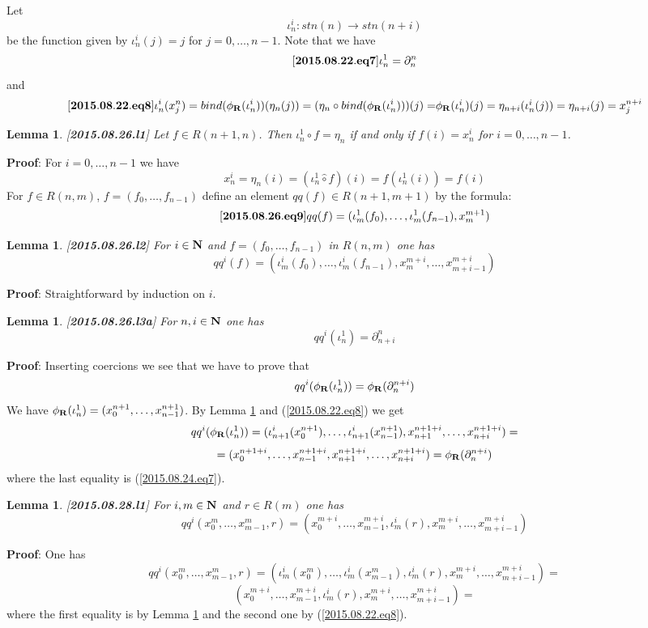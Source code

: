 \documentclass[11pt]{article}
\newenvironment{eq}{\begin{equation}}{\end{equation}}
\newenvironment{proof}{{\bf Proof}:}{\vskip 5mm }
\newtheorem{lemma}[proposition]{Lemma}
\newcommand{\llabel}[1]{\label{#1}[{\bf #1}]}
\newcommand{\sr}{\rightarrow}
\newcommand{\nn}{{\bf N\rm}}
\newcommand{\nat}{\nn}
\newcommand{\rr}{{\bf R}}
\newcommand{\wh}{\widehat}
\newcommand{\bind}{bind}
\newcommand{\hc}{\wh{\circ}}
\begin{document}
Let 
%
$${\iota}_n^{i}:stn(n)\sr stn(n+i)$$
%
be the function given by ${\iota}_n^i(j)=j$ for $j=0,\dots,n-1$. Note that we have
%
\begin{eq}
\llabel{2015.08.22.eq7}
{\iota}_n^{1}=\partial_{n}^{n}
\end{eq}
%
and
%
\begin{eq}
\llabel{2015.08.22.eq8}
{\iota}_n^i(x^n_j)=\bind(\phi_{\rr}(\iota_n^i))(\eta_n(j))=(\eta_n\circ \bind(\phi_{\rr}(\iota_n^i)))(j)=$$$$\phi_{\rr}(\iota_n^i)(j)=\eta_{n+i}(\iota_n^i(j))=\eta_{n+i}(j)=x^{n+i}_j
\end{eq}
%
\begin{lemma}
\llabel{2015.08.26.l1}
Let $f\in R(n+1,n)$. Then $\iota_n^1\hc f=\eta_n$ if and only if $f(i)=x_n^i$ for $i=0,\dots,n-1$. 
\end{lemma}
%
\begin{proof}
For $i=0,\dots,n-1$ we have
%
$$x_n^i=\eta_n(i)=(\iota_n^1\hc f)(i)=f(\iota_n^1(i))=f(i)$$
%
\end{proof}
%
For $f\in R(n,m)$, $f=(f_0,\dots,f_{n-1})$ define an element $qq(f)\in R(n+1,m+1)$ by the formula: 
%
\begin{eq}\llabel{2015.08.26.eq9}
qq(f)=(\iota_m^1(f_0),\dots,\iota_m^1(f_{n-1}),x_m^{m+1})
\end{eq}
%
\begin{lemma}
\llabel{2015.08.26.l2}
For $i\in\nat$ and $f=(f_0,\dots,f_{n-1})$ in $R(n,m)$ one has
%
$$qq^i(f)=(\iota_m^i(f_0),\dots,\iota_m^i(f_{n-1}),x_m^{m+i},\dots,x_{m+i-1}^{m+i})$$
%
\end{lemma}
%
\begin{proof}
Straightforward by induction on $i$.
\end{proof}
%
\begin{lemma}
\llabel{2015.08.26.l3a}
For $n,i\in\nat$ one has
%
$$qq^i(\iota_n^1)=\partial^n_{n+i}$$
%
\end{lemma}
%
\begin{proof}
Inserting coercions we see that we have to prove that
%
$$qq^i(\phi_{\rr}(\iota_n^1))=\phi_{\rr}(\partial_n^{n+i})$$
%
We have $\phi_{\rr}(\iota_n^1)=(x_0^{n+1},\dots,x^{n+1}_{n-1})$. By Lemma \ref{2015.08.26.l2} and (\ref{2015.08.22.eq8}) we get
%
$$qq^i(\phi_{\rr}(\iota_n^1))=(\iota_{n+1}^i(x_0^{n+1}),\dots,\iota_{n+1}^i(x_{n-1}^{n+1}),x_{n+1}^{n+1+i},\dots,x_{n+i}^{n+1+i})=$$
$$=(x_0^{n+1+i},\dots,x_{n-1}^{n+1+i},x_{n+1}^{n+1+i},\dots,x_{n+i}^{n+1+i})=\phi_{\rr}(\partial_n^{n+i})$$
%
where the last equality is (\ref{2015.08.24.eq7}). 
\end{proof}
%
\begin{lemma}
\llabel{2015.08.28.l1}
For $i,m\in\nat$ and $r\in R(m)$ one has
%
$$qq^i(x_0^m,\dots,x^m_{m-1},r)=(x_0^{m+i},\dots,x^{m+i}_{m-1},\iota_m^i(r),x_m^{m+i},\dots,x_{m+i-1}^{m+i})$$
%
\end{lemma}
%
\begin{proof}
One has
%
$$qq^i(x_0^m,\dots,x^m_{m-1},r)=(\iota_m^i(x_0^m),\dots,\iota_m^i(x^m_{m-1}),\iota_m^i(r),x_m^{m+i},\dots,x_{m+i-1}^{m+i})=$$
$$(x_0^{m+i},\dots,x^{m+i}_{m-1},\iota_m^i(r),x_m^{m+i},\dots,x_{m+i-1}^{m+i})=$$
%
where the first equality is by Lemma \ref{2015.08.26.l2} and the second one by (\ref{2015.08.22.eq8}). 
\end{proof}
\end{document}
